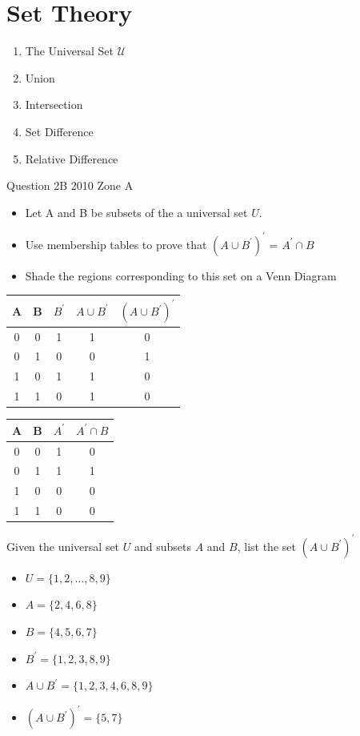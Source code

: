 \documentclass[]{report}
\begin{document}
\section{Set Theory}
\begin{enumerate}
\item The Universal Set $\mathcal{U}$
\item Union
\item Intersection
\item Set Difference
\item Relative Difference
\end{enumerate}


\newpage

Question 2B 2010 Zone A


\begin{itemize}
	\item Let A and B be subsets of the a universal set $U$.
	\item Use membership tables to prove that $(A \cup B^{\prime})^{\prime}$ = $A^{\prime} \cap B$
	\item Shade the regions corresponding to this set on a Venn Diagram
\end{itemize}

\begin{tabular}{|c|c|| c | c| c|}
	A	&	B	&	$B^{\prime}$	&	$A \cup B^{\prime}$	&	$(A \cup B^{\prime})^{\prime}$	\\ \hline
	0	&	0	&	1	&	1	&	0	\\
	0	&	1	&	0	&	0	&	1	\\
	1	&	0	&	1	&	1	&	0	\\
	1	&	1	&	0	&	1	&	0	\\
\end{tabular}									

\begin{tabular}{|c|c|| c | c| }									
	A	&	B	&	$A^{\prime}$	&	$A^{\prime} \cap B$	\\	\hline	
	0	&	0	&	1	&	0	\\		
	0	&	1	&	1	&	1	\\		
	1	&	0	&	0	&	0	\\		
	1	&	1	&	0	&	0	\\		
\end{tabular}



Given the universal set $U$ and subsets $A$ and $B$, list the set $(A \cup B^{\prime})^{\prime}$
\begin{itemize}
	\item $U=\{1,2,\ldots,8,9\}$
	\item $A=\{2,4,6,8\}$
	\item $B=\{ 4,5,6,7\}$
	\item $B^{\prime}=\{ 1, 2, 3, 8, 9  \}$
	\item $A \cup B^{\prime}=\{ 1, 2, 3,4, 6, 8, 9  \}$
	\item $(A \cup B^{\prime})^{\prime}=\{ 5,7 \}$
\end{itemize}
\end{document}
